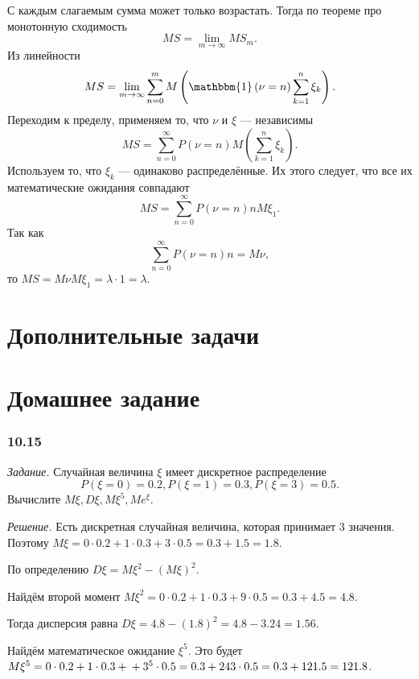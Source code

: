 С каждым слагаемым сумма может только возрастать.
Тогда по теореме про монотонную сходимость
$$MS =
\lim \limits_{m \to \infty } MS_m.$$
Из линейности
$$MS =
\lim \limits_{m \to \infty } \sum \limits_{n=0}^m M \left( \mathbbm{1} \left( \nu = n \right) \sum \limits_{k=1}^n \xi_k \right).$$
Переходим к пределу, применяем то, что $ \nu $ и $ \xi $ --- независимы
$$MS =
\sum \limits_{n=0}^{ \infty } P \left( \nu = n \right) M \left( \sum \limits_{k=1}^n \xi_k \right).$$
Используем то, что $ \xi_k$ --- одинаково распределённые.
Их этого следует, что все их математические ожидания совпадают
$$MS =
\sum \limits_{n=0}^{ \infty } P \left( \nu = n \right) nM \xi_1.$$
Так как
$$\sum \limits_{n=0}^{ \infty } P \left( \nu = n \right) n =
M \nu,$$
то $MS = M \nu M \xi_1 = \lambda \cdot 1 = \lambda $.

\section*{Дополнительные задачи}

\section*{Домашнее задание}

\subsubsection*{10.15}

\textit{Задание.} Случайная величина $ \xi $ имеет дискретное распределение
$$P \left( \xi = 0 \right) = 0.2,
P \left( \xi = 1 \right) = 0.3,
P \left( \xi = 3 \right) = 0.5.$$
Вычислите $M \xi, D \xi, M \xi^5, Me^{ \xi }$.

\textit{Решение.} Есть дискретная случайная величина, которая принимает 3 значения.
Поэтому $M \xi = 0 \cdot 0.2 + 1 \cdot 0.3 + 3 \cdot 0.5 = 0.3 + 1.5 = 1.8$.

По определению $D \xi = M \xi^2 - \left( M \xi \right)^2$.

Найдём второй момент $M \xi^2 = 0 \cdot 0.2 + 1 \cdot 0.3 + 9 \cdot 0.5 = 0.3 + 4.5 = 4.8$.

Тогда дисперсия равна $D \xi = 4.8 - \left( 1.8 \right)^2 = 4.8 - 3.24 = 1.56$.

Найдём математическое ожидание $ \xi^5$.
Это будет $M \xi^5 = 0 \cdot 0.2 + 1 \cdot 0.3 + \\
+ 3^5 \cdot 0.5 = 0.3 + 243 \cdot 0.5 = 0.3 + 121.5 = 121.8$.

